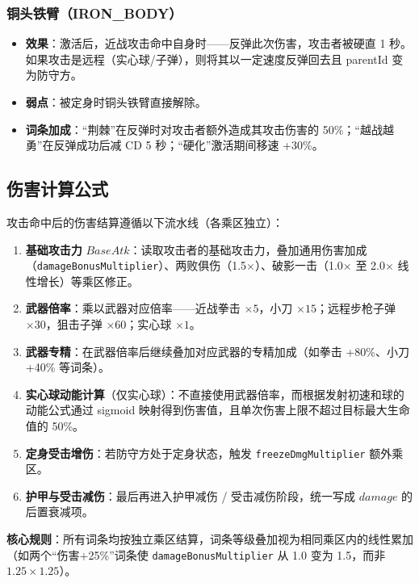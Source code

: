 \documentclass[utf8]{ctexart}
\begin{document}
\subsubsection{铜头铁臂（IRON\_BODY）}

\begin{itemize}
  \item \textbf{效果}：激活后，近战攻击命中自身时——反弹此次伤害，攻击者被硬直 1 秒。如果攻击是远程（实心球/子弹），则将其以一定速度反弹回去且 parentId 变为防守方。
  \item \textbf{弱点}：被定身时铜头铁臂直接解除。
  \item \textbf{词条加成}：“荆棘”在反弹时对攻击者额外造成其攻击伤害的 50\%；“越战越勇”在反弹成功后减 CD 5 秒；“硬化”激活期间移速 +30\%。
\end{itemize}

\subsection{伤害计算公式}

攻击命中后的伤害结算遵循以下流水线（各乘区独立）：

\begin{enumerate}
  \item \textbf{基础攻击力} $\mathit{BaseAtk}$：读取攻击者的基础攻击力，叠加通用伤害加成（\texttt{damageBonusMultiplier}）、两败俱伤（1.5$\times$）、破影一击（1.0$\times$ 至 2.0$\times$ 线性增长）等乘区修正。
  \item \textbf{武器倍率}：乘以武器对应倍率——近战拳击 $\times 5$，小刀 $\times 15$；远程步枪子弹 $\times 30$，狙击子弹 $\times 60$；实心球 $\times 1$。
  \item \textbf{武器专精}：在武器倍率后继续叠加对应武器的专精加成（如拳击 +80\%、小刀 +40\% 等词条）。
  \item \textbf{实心球动能计算}（仅实心球）：不直接使用武器倍率，而根据发射初速和球的动能公式通过 sigmoid 映射得到伤害值，且单次伤害上限不超过目标最大生命值的 50\%。
  \item \textbf{定身受击增伤}：若防守方处于定身状态，触发 \texttt{freezeDmgMultiplier} 额外乘区。
  \item \textbf{护甲与受击减伤}：最后再进入护甲减伤 / 受击减伤阶段，统一写成 $\mathit{damage}$ 的后置衰减项。
\end{enumerate}

\textbf{核心规则}：所有词条均按独立乘区结算，词条等级叠加视为相同乘区内的线性累加（如两个“伤害+25\%”词条使 \texttt{damageBonusMultiplier} 从 1.0 变为 1.5，而非 $1.25 \times 1.25$）。
\end{document}
